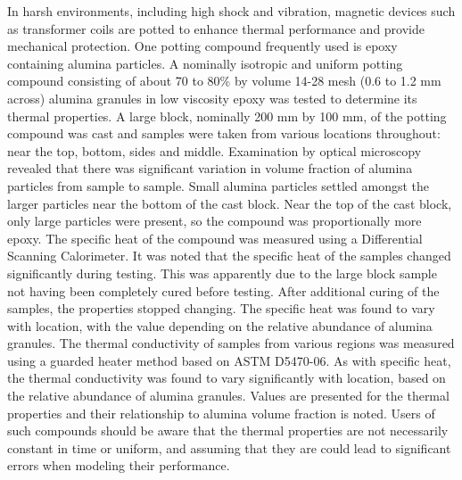 	In harsh environments, including high shock and vibration, magnetic devices such as transformer coils are potted to enhance thermal performance and provide mechanical protection.  One potting compound frequently used is epoxy containing alumina particles.
	A nominally isotropic and uniform potting compound consisting of about 70 to 80\% by volume 14-28 mesh (0.6 to 1.2 mm across) alumina granules in low viscosity epoxy was tested to determine its thermal properties.  A large block, nominally 200 mm by 100 mm, of the potting compound was cast and samples were taken from various locations throughout: near the top, bottom, sides and middle.  Examination by optical microscopy revealed that there was significant variation in volume fraction of alumina particles from sample to sample.  Small alumina particles settled amongst the larger particles near the bottom of the cast block.  Near the top of the cast block, only large particles were present, so the compound was proportionally more epoxy.
	The specific heat of the compound was measured using a Differential Scanning Calorimeter.  It was noted that the specific heat of the samples changed significantly during testing.  This was apparently due to the large block sample not having been completely cured before testing.  After additional curing of the samples, the properties stopped changing.  The specific heat was found to vary with location, with the value depending on the relative abundance of alumina granules.
	The thermal conductivity of samples from various regions was measured using a guarded heater method based on ASTM D5470-06.  As with specific heat, the thermal conductivity was found to vary significantly with location, based on the relative abundance of alumina granules.
	Values are presented for the thermal properties and their relationship to alumina volume fraction is noted.  Users of such compounds should be aware that the thermal properties are not necessarily constant in time or uniform, and assuming that they are could lead to significant errors when modeling their performance.

